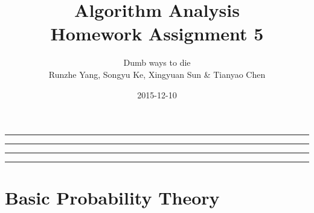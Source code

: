 \documentclass[12pt,a4]{article}
\newcounter{exercise}
\begin{document}
\date{2015-12-10}

\author{Dumb ways to die\\
Runzhe Yang, Songyu Ke, Xingyuan Sun \& Tianyao Chen}

\title{Algorithm Analysis\\
  Homework Assignment 5 \\
}
\maketitle
\hrule\hrule\hrule\hrule
\setcounter{section}{4}
\section{Basic Probability Theory}
\setcounter{subsection}{0}

\begin{exercise}
	
\end{exercise}

\begin{exercise}

\end{exercise}

\begin{exercise}
	
\end{exercise}
\end{document}
